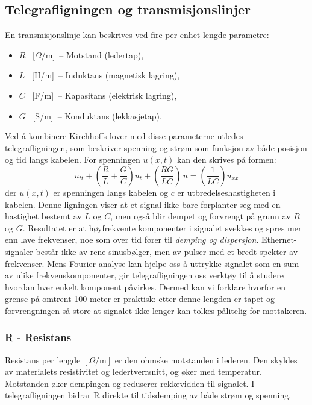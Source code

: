 \subsection{Telegrafligningen og transmisjonslinjer}
En transmisjonslinje kan beskrives ved fire per-enhet-lengde parametre:
\begin{itemize}
    \item $R$ \, [$\Omega$/m] \,-- Motstand (ledertap),
    \item $L$ \, [H/m] \,-- Induktans (magnetisk lagring),
    \item $C$ \, [F/m] \,-- Kapasitans (elektrisk lagring),
    \item $G$ \, [S/m] \,-- Konduktans (lekkasjetap).
\end{itemize}
Ved å kombinere Kirchhoffs lover med disse parameterne utledes telegrafligningen, som beskriver spenning og strøm som funksjon av både posisjon og tid langs kabelen. For spenningen $u(x,t)$ kan den skrives på formen:
\begin{equation}
    u_{tt} + \left(\frac{R}{L} + \frac{G}{C}\right)u_t + \left(\frac{RG}{LC}\right)\,u = \left(\frac{1}{LC}\right) u_{xx}
\end{equation}
der $u(x,t)$ er spenningen langs kabelen og $c$ er utbredelseshastigheten i kabelen.  
Denne ligningen viser at et signal ikke bare forplanter seg med en hastighet bestemt av $L$ og $C$, men også blir dempet og forvrengt på grunn av $R$ og $G$. Resultatet er at høyfrekvente komponenter i signalet svekkes og spres mer enn lave frekvenser, noe som over tid fører til \emph{demping og dispersjon}.  
Ethernet-signaler består ikke av rene sinusbølger, men av pulser med et bredt spekter av frekvenser. Mens Fourier-analyse kan hjelpe oss  å uttrykke signalet som en sum av ulike frekvenskomponenter, gir telegrafligningen oss verktøy til å studere hvordan hver enkelt komponent påvirkes. Dermed kan vi forklare hvorfor en grense på omtrent 100 meter er praktisk: etter denne lengden er tapet og forvrengningen så store at signalet ikke lenger kan tolkes pålitelig for mottakeren.


\subsubsection{R - Resistans}
Resistans per lengde $[\Omega/\mathrm{m}]$ er den ohmske motstanden i lederen. Den skyldes av materialets resistivitet og ledertverrsnitt, og øker med temperatur. Motstanden øker dempingen og reduserer rekkevidden til signalet. I telegrafligningen bidrar R direkte til tidsdemping av både strøm og spenning.

